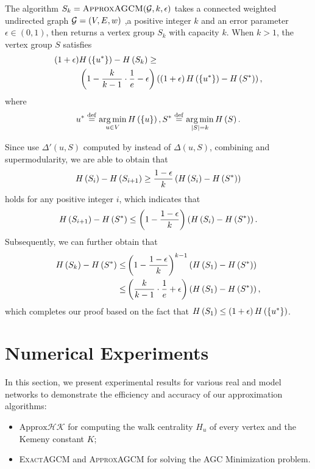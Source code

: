 \documentclass[journal]{IEEEtran}
\begin{document}
\begin{theorem}
    The algorithm \(S_k=\textsc{ApproxAGCM}(\mathcal{G},k,\epsilon)\) takes a connected weighted undirected graph \(\mathcal{G}=(V,E,w)\) ,a positive integer \(k\) and an error parameter \(\epsilon\in(0,1)\), then returns a vertex group \(S_k\) with capacity \(k\). When \(k>1\), the vertex group \(S\) satisfies
    \begin{align*}
        \left( 1+\epsilon \right) & H\left(\left\{u^* \right\}\right)-H\left(S_k\right)\ge                                                                         \\
                           & \left( 1-\frac{k}{k-1}\cdot\frac{1}{e}-\epsilon \right)\left( \left( 1+\epsilon \right)H\left(\left\{u^* \right\}\right)-H\left(S^*\right) \right),
    \end{align*}
    where
    \[u^*\stackrel{\mathrm{def}}{=}\operatorname*{arg\,min}_{u\in V}H\left(\left\{u \right\}\right),S^*\stackrel{\mathrm{def}}{=}\operatorname*{arg\,min}_{\left|S \right|=k}H\left(S\right).\]
\end{theorem}
\begin{IEEEproof}
    Since  use \(\Delta'(u,S)\) computed by  instead of \(\Delta(u,S)\), combining  and supermodularity, we are able to obtain that
    \begin{equation*}
        H\left(S_i\right)-H\left(S_{i+1}\right)\ge\frac{1-\epsilon}{k}\left( H\left(S_i\right)-H\left(S^*\right) \right)
    \end{equation*}
    holds for any positive integer \(i\), which indicates that
    \begin{equation*}
        H\left(S_{i+1}\right)-H\left(S^*\right)\le\left( 1-\frac{1-\epsilon}{k} \right)\left( H\left(S_i\right)-H\left(S^*\right) \right).
    \end{equation*}
    Subsequently, we can further obtain that
    \begin{align*}
        H\left(S_k\right)-H\left(S^*\right) \le & \left( 1-\frac{1-\epsilon}{k} \right)^{k-1}\left( H\left(S_1\right)-H\left(S^*\right) \right)            \\
        \le                       & \left( \frac{k}{k-1}\cdot\frac{1}{e}+\epsilon \right)\left( H\left(S_1\right)-H\left(S^*\right) \right),
    \end{align*}
    which completes our proof based on the fact that \(H\left(S_1\right)\le\left( 1+\epsilon \right)H\left(\left\{u^* \right\}\right)\).
\end{IEEEproof}

\section{Numerical Experiments}

In this section, we present experimental results for various real and model networks to demonstrate the  efficiency and accuracy of our approximation algorithms:
\begin{itemize}
    \item \(\text{Approx}\mathcal{HK}\) for computing the walk centrality \(H_u\) of  every vertex and the Kemeny constant \(K\);
    \item \textsc{ExactAGCM} and \textsc{ApproxAGCM} for solving the AGC Minimization problem.
\end{itemize}
\end{document}
